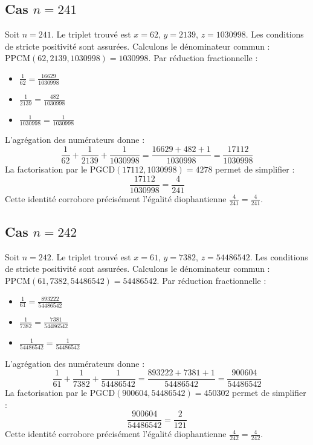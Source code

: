 \documentclass[11pt,a4paper]{article}
\begin{document}
\subsection{Cas $n = 241$}
Soit $n = 241$. Le triplet trouvé est $x = 62$, $y = 2139$, $z = 1030998$.
Les conditions de stricte positivité sont assurées.
Calculons le dénominateur commun : $\text{PPCM}(62, 2139, 1030998) = 1030998$.
Par réduction fractionnelle :
\begin{itemize}
    \item $\frac{1}{62} = \frac{16629}{1030998}$
    \item $\frac{1}{2139} = \frac{482}{1030998}$
    \item $\frac{1}{1030998} = \frac{1}{1030998}$
\end{itemize}
L'agrégation des numérateurs donne :
$$ \frac{1}{62} + \frac{1}{2139} + \frac{1}{1030998} = \frac{16629 + 482 + 1}{1030998} = \frac{17112}{1030998} $$
La factorisation par le $\text{PGCD}(17112, 1030998) = 4278$ permet de simplifier :
$$ \frac{17112}{1030998} = \frac{4}{241} $$
Cette identité corrobore précisément l'égalité diophantienne $\frac{4}{241} = \frac{4}{241}$.

\subsection{Cas $n = 242$}
Soit $n = 242$. Le triplet trouvé est $x = 61$, $y = 7382$, $z = 54486542$.
Les conditions de stricte positivité sont assurées.
Calculons le dénominateur commun : $\text{PPCM}(61, 7382, 54486542) = 54486542$.
Par réduction fractionnelle :
\begin{itemize}
    \item $\frac{1}{61} = \frac{893222}{54486542}$
    \item $\frac{1}{7382} = \frac{7381}{54486542}$
    \item $\frac{1}{54486542} = \frac{1}{54486542}$
\end{itemize}
L'agrégation des numérateurs donne :
$$ \frac{1}{61} + \frac{1}{7382} + \frac{1}{54486542} = \frac{893222 + 7381 + 1}{54486542} = \frac{900604}{54486542} $$
La factorisation par le $\text{PGCD}(900604, 54486542) = 450302$ permet de simplifier :
$$ \frac{900604}{54486542} = \frac{2}{121} $$
Cette identité corrobore précisément l'égalité diophantienne $\frac{4}{242} = \frac{4}{242}$.
\end{document}
